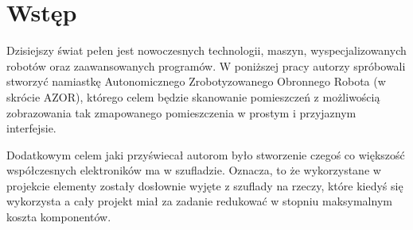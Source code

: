 \section*{Wstęp}
{}
    \tab Dzisiejszy świat pełen jest nowoczesnych technologii, maszyn, 
    wyspecjalizowanych robotów oraz zaawansowanych programów. 
    W poniższej pracy autorzy spróbowali stworzyć namiastkę 
    Autonomicznego Zrobotyzowanego Obronnego Robota (w skrócie AZOR), 
    którego celem będzie skanowanie pomieszczeń z możliwością zobrazowania tak zmapowanego pomieszczenia w prostym i przyjaznym interfejsie.

    Dodatkowym celem jaki przyświecał autorom było stworzenie czegoś co większość współczesnych elektroników ma w szufladzie.
    Oznacza, to że wykorzystane w projekcie elementy zostały dosłownie wyjęte z szuflady na rzeczy, które kiedyś się wykorzysta a cały projekt miał za zadanie redukować w stopniu maksymalnym koszta komponentów.
